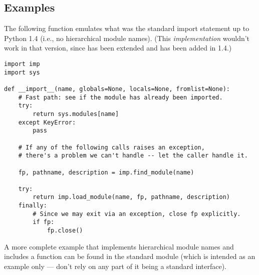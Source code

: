 \subsection{Examples}
\label{examples-imp}

The following function emulates what was the standard import statement
up to Python 1.4 (i.e., no hierarchical module names).  (This
\emph{implementation} wouldn't work in that version, since
 has been extended and
 has been added in 1.4.)

\begin{verbatim}
import imp
import sys

def __import__(name, globals=None, locals=None, fromlist=None):
    # Fast path: see if the module has already been imported.
    try:
        return sys.modules[name]
    except KeyError:
        pass

    # If any of the following calls raises an exception,
    # there's a problem we can't handle -- let the caller handle it.

    fp, pathname, description = imp.find_module(name)
    
    try:
        return imp.load_module(name, fp, pathname, description)
    finally:
        # Since we may exit via an exception, close fp explicitly.
        if fp:
            fp.close()
\end{verbatim}

A more complete example that implements hierarchical module names and
includes a  function can be
found in the standard module  (which
is intended as an example only --- don't rely on any part of it being
a standard interface).

